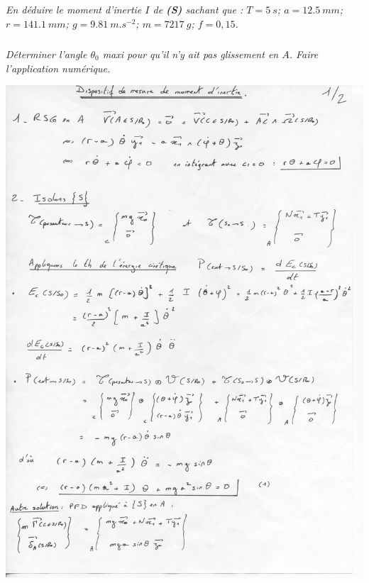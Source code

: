 \documentclass[10pt,fleqn]{article} %
\begin{document}
\begin{multicols}{2}
\subparagraph{}\textit{En déduire le moment d'inertie $I$ de \textbf{(S)} sachant que :
$T=\SI{5}{s}$; $a =\SI{12,5}{mm}$; $r = \SI{141,1}{mm}$; $g = \SI{9,81}{m.s^{-2}}$;	$m = \SI{7217}{g}$; $f = 0,15$.}
\subparagraph{}\textit{Déterminer l’angle $\theta_0$ maxi pour qu’il n’y ait pas glissement en $A$. Faire l’application numérique.}


\ifprof
\else
\end{multicols}
\fi

\newpage
%
\begin{center}
\includegraphics[width=\linewidth]{images/cor_01}
\end{center}
\end{document}
